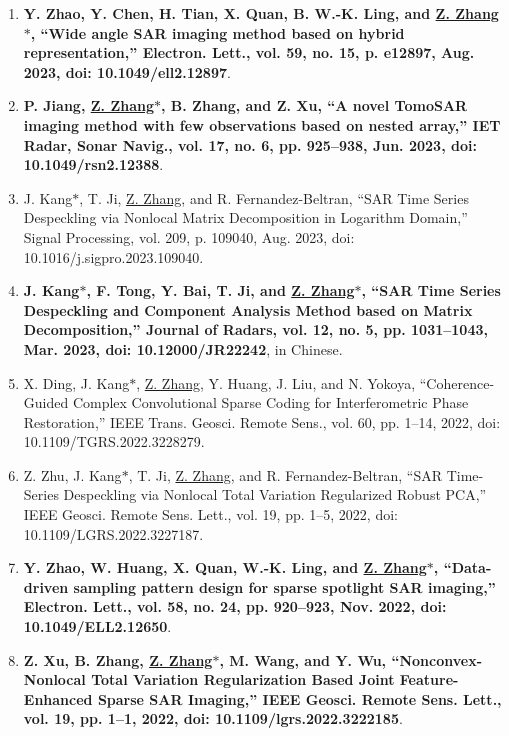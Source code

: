 \documentclass[paper=a4,fontsize=11pt]{scrartcl}
\begin{document}
\begin{enumerate}
\item \textbf{Y. Zhao, Y. Chen, H. Tian, X. Quan, B. W.-K. Ling, and \underline{Z. Zhang$\ast$}, ``Wide angle SAR imaging method based on hybrid representation,'' Electron. Lett., vol. 59, no. 15, p. e12897, Aug. 2023, doi: 10.1049/ell2.12897}.

\item \textbf{P. Jiang, \underline{Z. Zhang$\ast$}, B. Zhang, and Z. Xu, ``A novel TomoSAR imaging method with few observations based on nested array,'' IET Radar, Sonar Navig., vol. 17, no. 6, pp. 925–938, Jun. 2023, doi: 10.1049/rsn2.12388}.

\item J. Kang$\ast$, T. Ji, \underline{Z. Zhang}, and R. Fernandez-Beltran, ``SAR Time Series Despeckling via Nonlocal Matrix Decomposition in Logarithm Domain,'' Signal Processing, vol. 209, p. 109040, Aug. 2023, doi: 10.1016/j.sigpro.2023.109040.

\item \textbf{J. Kang$\ast$, F. Tong, Y. Bai, T. Ji, and \underline{Z. Zhang$\ast$}, ``SAR Time Series Despeckling and Component Analysis Method based on Matrix Decomposition,'' Journal of Radars, vol. 12, no. 5, pp. 1031–1043, Mar. 2023, doi: 10.12000/JR22242}, in Chinese.

\item X. Ding, J. Kang$\ast$, \underline{Z. Zhang}, Y. Huang, J. Liu, and N. Yokoya, ``Coherence-Guided Complex Convolutional Sparse Coding for Interferometric Phase Restoration,'' IEEE Trans. Geosci. Remote Sens., vol. 60, pp. 1–14, 2022, doi: 10.1109/TGRS.2022.3228279.

\item Z. Zhu, J. Kang$\ast$, T. Ji, \underline{Z. Zhang}, and R. Fernandez-Beltran, ``SAR Time-Series Despeckling via Nonlocal Total Variation Regularized Robust PCA,'' IEEE Geosci. Remote Sens. Lett., vol. 19, pp. 1–5, 2022, doi: 10.1109/LGRS.2022.3227187.​

\item \textbf{Y. Zhao, W. Huang, X. Quan, W.-K. Ling, and \underline{Z. Zhang$\ast$}, ``Data-driven sampling pattern design for sparse spotlight SAR imaging,'' Electron. Lett., vol. 58, no. 24, pp. 920–923, Nov. 2022, doi: 10.1049/ELL2.12650}.

\item \textbf{Z. Xu, B. Zhang, \underline{Z. Zhang$\ast$}, M. Wang, and Y. Wu, ``Nonconvex-Nonlocal Total Variation Regularization Based Joint Feature-Enhanced Sparse SAR Imaging,'' IEEE Geosci. Remote Sens. Lett., vol. 19, pp. 1–1, 2022, doi: 10.1109/lgrs.2022.3222185}.


\end{enumerate}
\end{document}
